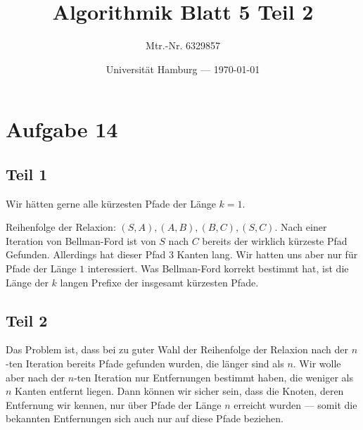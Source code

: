 \documentclass[parskip=half,a4paper]{scrartcl}
\title{Algorithmik Blatt 5 Teil 2}
\author{Mtr.-Nr. 6329857}
\date{Universität Hamburg --- \today}
\begin{document}
\maketitle %
\linenumbers

\section*{Aufgabe 14}

\subsection*{Teil 1}



Wir hätten gerne alle kürzesten Pfade der Länge $k=1$.

Reihenfolge der Relaxion: $(S,A), (A,B), (B,C), (S,C)$. Nach einer Iteration von Bellman-Ford ist von $S$ nach $C$ bereits der wirklich kürzeste Pfad Gefunden. Allerdings hat dieser Pfad $3$ Kanten lang. Wir hatten uns aber nur für Pfade der Länge $1$ interessiert. Was Bellman-Ford korrekt bestimmt hat, ist die Länge der $k$ langen Prefixe der insgesamt kürzesten Pfade.

\subsection*{Teil 2}

Das Problem ist, dass bei zu guter Wahl der Reihenfolge der Relaxion nach der $n$-ten Iteration bereits Pfade gefunden wurden, die länger sind als $n$. Wir wolle aber nach der $n$-ten Iteration nur Entfernungen bestimmt haben, die weniger als $n$ Kanten entfernt liegen. Dann können wir sicher sein, dass die Knoten, deren Entfernung wir kennen, nur über Pfade der Länge $n$ erreicht wurden --- somit die bekannten Entfernungen sich auch nur auf diese Pfade beziehen.
\end{document}
